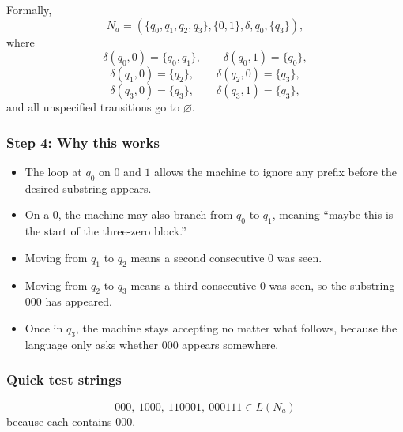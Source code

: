 \documentclass[12pt]{article}
\begin{document}
\begin{center}
\end{center}

Formally,
\[
N_a=(\{q_0,q_1,q_2,q_3\},\{0,1\},\delta,q_0,\{q_3\}),
\]
where
\[
\delta(q_0,0)=\{q_0,q_1\}, \qquad \delta(q_0,1)=\{q_0\},
\]
\[
\delta(q_1,0)=\{q_2\}, \qquad \delta(q_2,0)=\{q_3\},
\]
\[
\delta(q_3,0)=\{q_3\}, \qquad \delta(q_3,1)=\{q_3\},
\]
and all unspecified transitions go to \(\varnothing\).

\subsubsection*{Step 4: Why this works}

\begin{itemize}[itemsep=0.4em]
    \item The loop at \(q_0\) on \(0\) and \(1\) allows the machine to ignore any prefix before the desired substring appears.
    \item On a \(0\), the machine may also branch from \(q_0\) to \(q_1\), meaning ``maybe this is the start of the three-zero block.''
    \item Moving from \(q_1\) to \(q_2\) means a second consecutive \(0\) was seen.
    \item Moving from \(q_2\) to \(q_3\) means a third consecutive \(0\) was seen, so the substring \(000\) has appeared.
    \item Once in \(q_3\), the machine stays accepting no matter what follows, because the language only asks whether \(000\) appears somewhere.
\end{itemize}

\subsubsection*{Quick test strings}

\[
000,\ 1000,\ 110001,\ 000111 \in L(N_a)
\]
because each contains \(000\).
\end{document}
